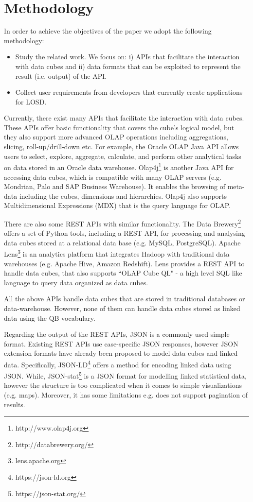 \documentclass{llncs}
\begin{document}
\section{Methodology}\label{sec:methodology}

In order to achieve the objectives of the paper we adopt the following methodology:
\begin{itemize}
\item Study the related work. We focus on: i) APIs that facilitate the interaction with data cubes and ii) data formats that can be exploited to represent the result (i.e. output) of the API. 
\item Collect user requirements from developers that currently create applications for LOSD. 
\end{itemize}

Currently, there exist many APIs that facilitate the interaction with data cubes. These APIs offer basic functionality that covers the cube's logical model, but they also support more advanced OLAP operations including aggregations, slicing, roll-up/drill-down etc. For example, the Oracle OLAP Java API \cite{ORACLEAPI} allows users to select, explore, aggregate, calculate, and perform other analytical tasks on data stored in an Oracle data warehouse. Olap4j\footnote{http://www.olap4j.org} is another Java API for accessing data cubes, which is compatible with many OLAP servers (e.g. Mondrian, Palo and SAP Business Warehouse). It enables the browsing of meta-data including the cubes, dimensions and  hierarchies. Olap4j also supports Multidimensional Expressions (MDX) that is the query language for OLAP.

There are also some REST APIs with similar functionality. The Data Brewery\footnote{http://databrewery.org/} offers a set of Python tools, including a REST API, for processing and analysing data cubes stored at a relational data base (e.g. MySQL, PostgreSQL). Apache Lens\footnote{lens.apache.org} is an analytics platform that integrates Hadoop with traditional data warehouses (e.g. Apache Hive, Amazon Redshift). Lens provides a REST API to handle data cubes, that also supports ``OLAP Cube QL" - a high level SQL like language to query data organized as data cubes.

All the above APIs handle data cubes that are stored in traditional databases or data-warehouse. However, none of them can handle data cubes  stored as linked data using the QB vocabulary.  

Regarding the output of the REST APIs, JSON is a commonly used simple format. Existing REST APIs use 
case-specific JSON responses, however JSON extension formats have already been proposed to model data cubes and linked data. Specifically, JSON-LD\footnote{https://json-ld.org} offers a method for encoding linked data using JSON. While, JSON-stat\footnote{https://json-stat.org/} is a JSON format for modelling linked statistical data, however the structure is too complicated when it comes to simple visualizations (e.g. maps). Moreover, it has some limitations e.g. does not support pagination of results. 
\end{document}
